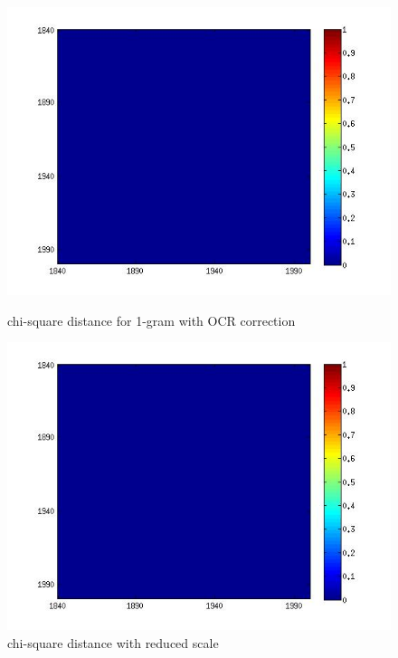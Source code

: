 \begin{figure}[H]
    \begin{minipage}[b]{0.48\linewidth}
        \includegraphics[scale=0.4]{Pictures/chi2/chi2_corrected2.jpg}
        \caption{chi-square distance for 1-gram with OCR correction}
        \label{chi2_1}
    \end{minipage}\hfill
    \begin{minipage}[b]{0.5\linewidth}
        \includegraphics[scale=0.4]{Pictures/chi2/chi2_corrected2.jpg}
        \caption{chi-square distance with reduced scale}
        \label{chi2_2}
    \end{minipage}\hfill
\end{figure}

